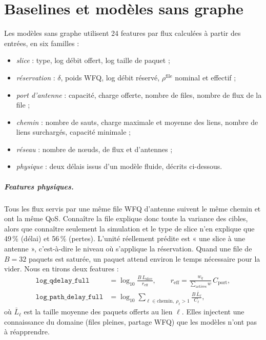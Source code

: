 \documentclass[11pt,a4paper]{report}
\begin{document}
\chapter{Baselines et modèles sans graphe}\label{chap:base}
Les modèles sans graphe utilisent 24 features par flux calculées à partir des entrées, en six familles :
\begin{itemize}[nosep]
  \item \emph{slice} : type, log débit offert, log taille de paquet ;
  \item \emph{réservation} : $\delta$, poids WFQ, log débit réservé, $\rho^{\text{file}}$ nominal et effectif ;
  \item \emph{port d'antenne} : capacité, charge offerte, nombre de files, nombre de flux de la file ;
  \item \emph{chemin} : nombre de sauts, charge maximale et moyenne des liens, nombre de liens surchargés, capacité minimale ;
  \item \emph{réseau} : nombre de nœuds, de flux et d'antennes ;
  \item \emph{physique} : deux délais issus d'un modèle fluide, décrits ci-dessous.
\end{itemize}

\paragraph{Features physiques.} Tous les flux servis par une même file WFQ d'antenne suivent le même chemin et ont la même QoS. Connaître la file explique donc toute la variance des cibles, alors que connaître seulement la simulation et le type de slice n'en explique que 49\,\% (délai) et 56\,\% (pertes). L'unité réellement prédite est « une slice à une antenne », c'est-à-dire le niveau où s'applique la réservation. Quand une file de $B=32$ paquets est saturée, un paquet attend environ le temps nécessaire pour la vider. Nous en tirons deux features :
\begin{align}
\texttt{log\_qdelay\_full}&=\log_{10}\frac{B\,L_{\text{slice}}}{r_{\text{eff}}},\qquad r_{\text{eff}}=\frac{w_q}{\sum_{\text{actives}}w}\,C_{\text{port}},\\
\texttt{log\_path\_delay\_full}&=\log_{10}\!\!\sum_{\ell\in\text{chemin},\ \rho_\ell>1}\!\!\frac{B\,\bar L_\ell}{C_\ell},
\end{align}
où $\bar L_\ell$ est la taille moyenne des paquets offerts au lien $\ell$. Elles injectent une connaissance du domaine (files pleines, partage WFQ) que les modèles n'ont pas à réapprendre.
\end{document}

